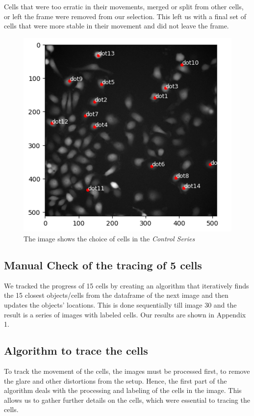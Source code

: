 \documentclass{article}
\begin{document}
Cells that were too erratic in their movements, merged or split from other cells, or left the frame were removed from our selection. This left us with a final set of cells that were more stable in their movement and did not leave the frame.

\begin{figure}[h!]
\centering
\includegraphics[width=0.75\linewidth]{Images/final_points_chosen.png}
\caption{\label{fig:ChoiceofCells-ControlSeries}The image shows the choice of cells in the \emph{Control Series}}
\end{figure}


\subsection*{Manual Check of the tracing of 5 cells}

We tracked the progress of 15 cells by creating an algorithm that iteratively finds the 15 closest objects/cells from the dataframe of the next image and then updates the objects' locations. This is done sequentially till image 30 and the result is a series of images with labeled cells. Our results are shown in Appendix 1. 

\subsection*{Algorithm to trace the cells}
To track the movement of the cells, the images must be processed first, to remove the glare and other distortions from the setup. Hence, the first part of the algorithm deals with the processing and labeling of the cells in the image. This allows us to gather further details on the cells, which were essential to tracing the cells. 
\end{document}
